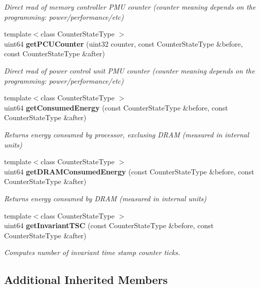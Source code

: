 \begin{DoxyCompactItemize}
\begin{DoxyCompactList}\small\item\em Direct read of memory controller P\+M\+U counter (counter meaning depends on the programming\+: power/performance/etc) \end{DoxyCompactList}\item 
{\footnotesize template$<$class Counter\+State\+Type $>$ }\\uint64 {\bf get\+P\+C\+U\+Counter} (uint32 counter, const Counter\+State\+Type \&before, const Counter\+State\+Type \&after)
\begin{DoxyCompactList}\small\item\em Direct read of power control unit P\+M\+U counter (counter meaning depends on the programming\+: power/performance/etc) \end{DoxyCompactList}\item 
{\footnotesize template$<$class Counter\+State\+Type $>$ }\\uint64 {\bf get\+Consumed\+Energy} (const Counter\+State\+Type \&before, const Counter\+State\+Type \&after)
\begin{DoxyCompactList}\small\item\em Returns energy consumed by processor, exclusing D\+R\+A\+M (measured in internal units) \end{DoxyCompactList}\item 
{\footnotesize template$<$class Counter\+State\+Type $>$ }\\uint64 {\bf get\+D\+R\+A\+M\+Consumed\+Energy} (const Counter\+State\+Type \&before, const Counter\+State\+Type \&after)
\begin{DoxyCompactList}\small\item\em Returns energy consumed by D\+R\+A\+M (measured in internal units) \end{DoxyCompactList}\item 
{\footnotesize template$<$class Counter\+State\+Type $>$ }\\uint64 {\bf get\+Invariant\+T\+S\+C} (const Counter\+State\+Type \&before, const Counter\+State\+Type \&after)
\begin{DoxyCompactList}\small\item\em Computes number of invariant time stamp counter ticks. \end{DoxyCompactList}\end{DoxyCompactItemize}
\subsection*{Additional Inherited Members}


